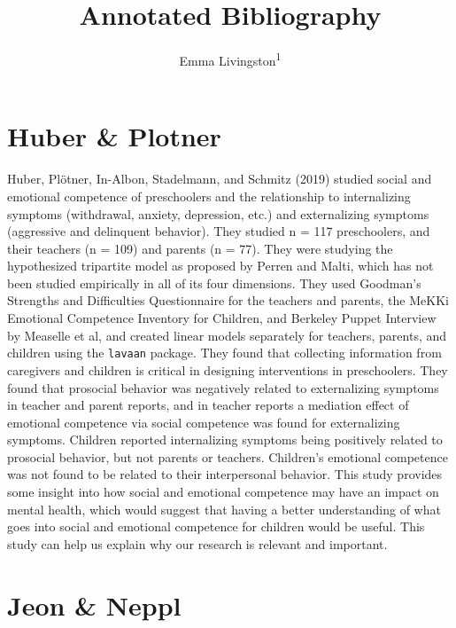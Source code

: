 \documentclass[man]{apa6}
\title{Annotated Bibliography}
\author{Emma Livingston\textsuperscript{1}}
\date{}
\affiliation{
\vspace{0.5cm}
\textsuperscript{1} Smith College}
\begin{document}
\maketitle

\hypertarget{huber-plotner}{%
\section{Huber \& Plotner}\label{huber-plotner}}

Huber, Plötner, In-Albon, Stadelmann, and Schmitz (2019) studied social and emotional competence of preschoolers and the relationship to internalizing symptoms (withdrawal, anxiety, depression, etc.) and externalizing symptoms (aggressive and delinquent behavior). They studied n = 117 preschoolers, and their teachers (n = 109) and parents (n = 77). They were studying the hypothesized tripartite model as proposed by Perren and Malti, which has not been studied empirically in all of its four dimensions. They used Goodman's Strengths and Difficulties Questionnaire for the teachers and parents, the MeKKi Emotional Competence Inventory for Children, and Berkeley Puppet Interview by Measelle et al, and created linear models separately for teachers, parents, and children using the \texttt{lavaan} package. They found that collecting information from caregivers and children is critical in designing interventions in preschoolers. They found that prosocial behavior was negatively related to externalizing symptoms in teacher and parent reports, and in teacher reports a mediation effect of emotional competence via social competence was found for externalizing symptoms. Children reported internalizing symptoms being positively related to prosocial behavior, but not parents or teachers. Children's emotional competence was not found to be related to their interpersonal behavior. This study provides some insight into how social and emotional competence may have an impact on mental health, which would suggest that having a better understanding of what goes into social and emotional competence for children would be useful. This study can help us explain why our research is relevant and important.

\hypertarget{jeon-neppl}{%
\section{Jeon \& Neppl}\label{jeon-neppl}}
\end{document}
